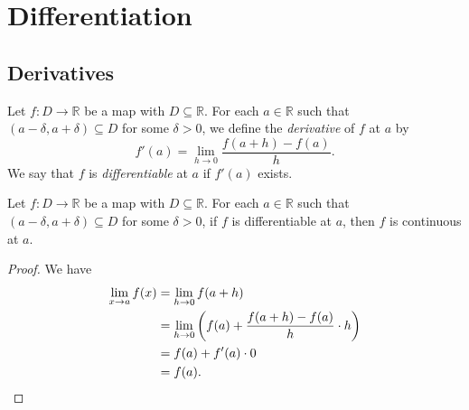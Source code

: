 \chapter{Differentiation}
\section{Derivatives}
\begin{definition}
  Let $f: D \to \mathbb{R}$ be a map with $D \subseteq \mathbb{R}$.
  For each $a \in \mathbb{R}$ such that $(a - \delta, a + \delta) \subseteq D$
  for some $\delta > 0$, we define the \emph{derivative} of $f$ at $a$ by
  \begin{equation*}
    f'(a) = \lim_{h \to 0} \frac{f(a + h) - f(a)}{h}.
  \end{equation*}
  We say that $f$ is \emph{differentiable} at $a$ if $f'(a)$ exists.
\end{definition}

\begin{theorem}
  Let $f: D \to \mathbb{R}$ be a map with $D \subseteq \mathbb{R}$.
  For each $a \in \mathbb{R}$ such that $(a - \delta, a + \delta) \subseteq D$
  for some $\delta > 0$, if $f$ is differentiable at $a$, then $f$ is
  continuous at $a$.
\end{theorem}
\begin{proof}
  We have
  \begin{align*}
    \lim_{x \to a} f(x)
    &= \lim_{h \to 0} f(a + h) \\
    &= \lim_{h \to 0} \left(f(a) + \frac{f(a + h) - f(a)}{h} \cdot h\right) \\
    &= f(a) + f'(a) \cdot 0 \\
    &= f(a).
    \qedhere
  \end{align*}
\end{proof}

